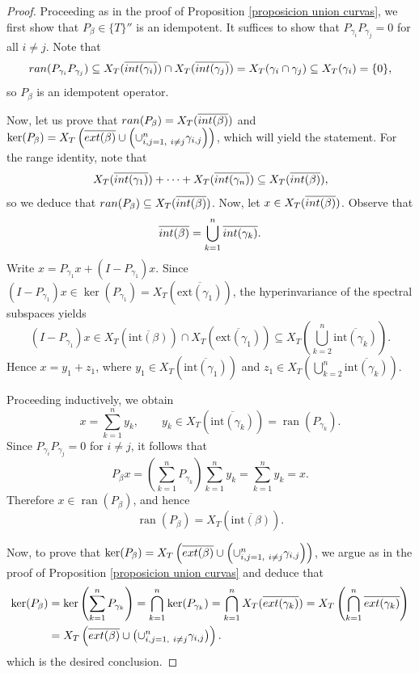 \documentclass[10pt,a4paper]{amsart}
\newcommand{\biconm}[1]{{\{#1\}''}}
\newcommand{\exte}{\textnormal{ext}}
\newcommand{\inte}{\textnormal{int}}
\newcommand{\ran}{\textnormal{ran}}
\begin{document}
\begin{proof}
Proceeding as in the proof of Proposition \ref{proposicion union curvas}, we first show that $P_\beta \in \biconm{T}$ is an idempotent. It suffices to show that $P_{\gamma_i}P_{\gamma_j}=0$ for all $i\neq j$. Note that
$$\ran(P_{\gamma_i}P_{\gamma_j}) \subseteq   X_T(\overline{\inte(\gamma_i)})\cap X_T(\overline{\inte(\gamma_j)}) = X_T(\gamma_i\cap \gamma_j) \subseteq   X_T(\gamma_i) = \{0\},$$ so $P_\beta$ is an idempotent operator.

\smallskip

Now, let us prove that $\ran(P_\beta) = X_T(\overline{\inte(\beta)})$ and $\ker(P_\beta) = X_T\left(\overline{\exte(\beta)}\cup \left(\cup_{i,j=1, \ i\neq j}^n \gamma_{i,j} \right) \right)$, which will yield the statement. For the range identity, note that
    $$
    X_T(\overline{\inte(\gamma_1)})+\cdots + X_T(\overline{\inte(\gamma_n)})\subseteq   X_T(\overline{\inte(\beta)}),
    $$ so we deduce that $\ran(P_\beta)\subseteq   X_T(\overline{\inte(\beta)})$. Now, let $x\in X_T(\overline{\inte(\beta)})$. Observe that
    $$
    \overline{\inte(\beta)} = \bigcup_{k=1}^n \overline{\inte(\gamma_k)}.
    $$
Write $x=P_{\gamma_1}x+(I-P_{\gamma_1})x$. Since $(I-P_{\gamma_1})x\in
\ker(P_{\gamma_1})=X_T(\overline{\mathrm{ext}(\gamma_1)})$, the hyperinvariance of the spectral subspaces yields
$$
(I-P_{\gamma_1})x\in X_T(\overline{\mathrm{int}(\beta)})\cap
X_T(\overline{\mathrm{ext}(\gamma_1)})
\subseteq X_T\!\left(\bigcup_{k=2}^n \overline{\mathrm{int}(\gamma_k)}\right).
$$
Hence $x=y_1+z_1$, where $y_1\in X_T(\overline{\mathrm{int}(\gamma_1)})$ and
$z_1\in X_T\!\left(\bigcup_{k=2}^n \overline{\mathrm{int}(\gamma_k)}\right)$.

\noindent Proceeding inductively, we obtain
$$
x=\sum_{k=1}^n y_k,
\qquad
y_k\in X_T(\overline{\mathrm{int}(\gamma_k)})=\operatorname{ran}(P_{\gamma_k}).
$$
Since $P_{\gamma_i}P_{\gamma_j}=0$ for $i\neq j$, it follows that
$$
P_\beta x
=\left(\sum_{k=1}^n P_{\gamma_k}\right)\sum_{k=1}^n y_k
=\sum_{k=1}^n y_k
=x.
$$
Therefore $x\in \operatorname{ran}(P_\beta)$, and hence
$$
\operatorname{ran}(P_\beta)=X_T(\overline{\mathrm{int}(\beta)}).
$$



Now, to prove that $\ker(P_\beta) = X_T\left(\overline{\exte(\beta)}\cup \left(\cup_{i,j=1, \ i\neq j}^n \gamma_{i,j} \right) \right)$, we argue as in the proof of Proposition \ref{proposicion union curvas} and deduce that
    \begin{equation*}
        \begin{split}
            \ker(P_\beta) &= \ker\left(\sum_{k=1}^n P_{\gamma_k}\right) = \bigcap\limits_{k=1}^n \ker(P_{\gamma_k}) = \bigcap\limits_{k=1}^n X_T(\overline{\exte(\gamma_k)})  = X_T\left(\bigcap\limits_{k=1}^n \overline{\exte(\gamma_k)} \right) \\& = X_T\left(\overline{\exte(\beta)}\cup \left(\cup_{i,j=1, \ i\neq j}^n \gamma_{i,j} \right) \right).
        \end{split}
    \end{equation*}
which is the desired conclusion.
\end{proof}
\end{document}
